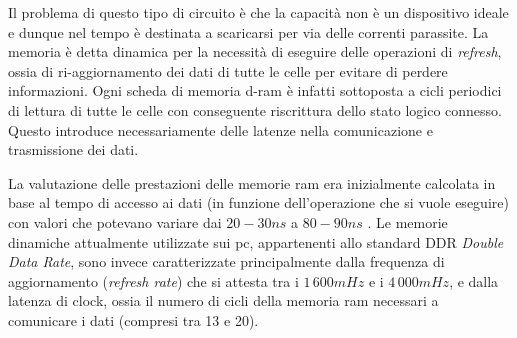 	Il problema di questo tipo di circuito è che la capacità non è un dispositivo ideale e dunque nel tempo è destinata a scaricarsi per via delle correnti parassite. La memoria è detta dinamica per la necessità di eseguire delle operazioni di \textit{refresh}, ossia di ri-aggiornamento dei dati di tutte le celle per evitare di perdere informazioni. Ogni scheda di memoria d-ram è infatti sottoposta a cicli periodici di lettura di tutte le celle con conseguente riscrittura dello stato logico connesso. Questo introduce necessariamente delle latenze nella comunicazione e trasmissione dei dati.
	
	La valutazione delle prestazioni delle memorie ram era inizialmente calcolata in base al tempo di accesso ai dati (in funzione dell'operazione che si vuole eseguire) con valori che potevano variare dai $20-30ns$ a $80-90ns$ \cite{raminfo}. Le memorie dinamiche attualmente utilizzate sui pc, appartenenti allo standard DDR \textit{Double Data Rate}, sono invece caratterizzate principalmente dalla frequenza di aggiornamento (\textit{refresh rate}) che si attesta tra i $1\,600 mHz$ e i $4\,000 mHz$, e dalla latenza di clock, ossia il numero di cicli della memoria ram necessari a comunicare i dati (compresi tra 13 e 20).



